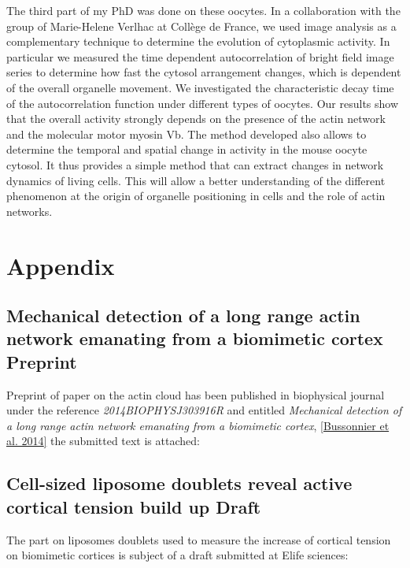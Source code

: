 \documentclass[A4paperpaper,11pt,english]{sphinxmanual}
\begin{document}
The third part of my PhD was done  on these oocytes. In a collaboration with
the group of Marie-Helene Verlhac at Collège de  France, we used image analysis
as a complementary technique to  determine the evolution of  cytoplasmic
activity. In particular we measured the time  dependent autocorrelation of
bright field image series to determine how fast the cytosol arrangement
changes, which is dependent of the overall organelle movement. We investigated
the characteristic decay time of the  autocorrelation function under  different
types of oocytes.  Our results show that  the overall activity  strongly
depends on  the presence of  the actin network and  the molecular motor myosin
Vb. The method developed  also allows to determine  the temporal  and  spatial
change  in activity  in  the mouse  oocyte cytosol. It  thus provides a simple
method that can extract  changes in network dynamics  of  living cells.  This
will  allow  a  better understanding  of  the different phenomenon  at the
origin  of organelle  positioning in cells  and the role of actin networks.


\chapter{Appendix}
\label{index-latex::doc}\label{index-latex:appendix}

\section{Mechanical detection of a long range actin network emanating from a biomimetic cortex Preprint}
\label{index-latex:mechanical-detection-of-a-long-range-actin-network-emanating-from-a-biomimetic-cortex-preprint}
Preprint of paper on the actin cloud has been published in biophysical
journal under the reference \emph{2014BIOPHYSJ303916R} and entitled \emph{Mechanical
detection of a long range actin network emanating from a biomimetic cortex},
{\hyperref[index-latex:bussonnier2014]{{[}Bussonnier et al. 2014{]}}} the submitted text is attached:



\section{Cell-sized liposome doublets reveal active cortical tension build up Draft}
\label{index-latex:cell-sized-liposome-doublets-reveal-active-cortical-tension-build-up-draft}
The part on liposomes doublets used to measure the increase of cortical tension
on biomimetic cortices is subject of a draft submitted at Elife sciences:

\end{document}
